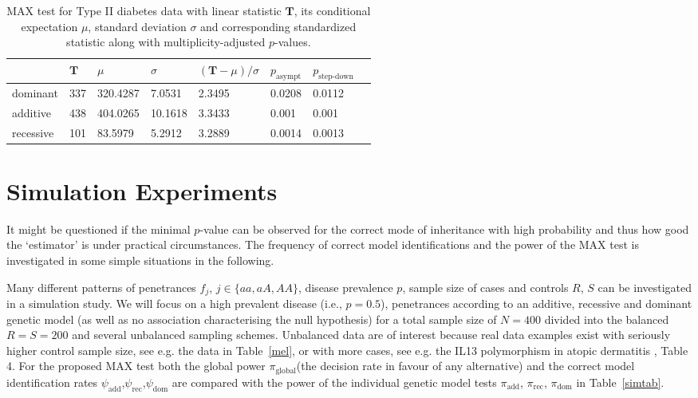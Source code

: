 \documentclass[bimj,fleqn]{w-art}
\newcommand{\T}{\mathbf{T}}
\begin{document}
\begin{table}
\begin{center}
\caption{MAX test for Type II diabetes data  with linear statistic  
         $\T$, its conditional expectation $\mu$, standard deviation 
         $\sigma$ and corresponding standardized statistic along with 
         multiplicity-adjusted $p$-values. \label{diares}}
\vspace*{0.5cm}
\begin{tabular}{l l l l l l l l}
 & $\T$ & $\mu$ & $ \sigma$ & $(\T - \mu) / \sigma$ & $p_\text{asympt}$ & $p_\text{step-down}$ \\ \hline
dominant  &  337 & 320.4287 & 7.0531 & 2.3495 & 0.0208 & 0.0112 \\ 
additive  &  438 & 404.0265 & 10.1618 & 3.3433 & 0.001 & 0.001 \\ 
recessive  &  101 & 83.5979 & 5.2912 & 3.2889 & 0.0014 & 0.0013 \\ \hline
\end{tabular}
\end{center}
\end{table}

\section{Simulation Experiments \label{sim}}

It might be questioned if the minimal $p$-value can be observed for the
correct mode of inheritance with high probability and thus how good the `estimator' 
is under practical circumstances. The frequency of
correct model identifications and the power of the MAX test is investigated
in some simple situations in the following.

Many different patterns of penetrances $f_j$, $j \in \{aa, aA, AA\}$, 
disease prevalence $p$, sample size of cases and controls 
$R$, $S$ can be investigated in a simulation study. We will 
focus on a high prevalent disease (i.e., $p=0.5$), penetrances according 
to an additive, recessive and dominant genetic model (as well as no 
association characterising the null hypothesis) for a total sample size 
of $N=400$ divided into the balanced $R=S=200$ and several unbalanced sampling schemes. 
Unbalanced data are of interest because real data examples exist with 
seriously higher control sample size, see e.g. the data in Table~\ref{mel}, 
or with more cases, see e.g. the IL13 polymorphism in atopic 
dermatitis \cite{Neuhauser:2002}, Table 4. For the proposed MAX test both the global 
power $\pi_\text{global}$(the decision rate in favour of any alternative) and the 
correct model identification rates $\psi_\text{add}$,$\psi_\text{rec}$,$\psi_\text{dom}$ 
are compared with the power of the individual genetic model tests 
$\pi_\text{add}$, $\pi_\text{rec}$, $\pi_\text{dom}$ in Table~\ref{simtab}.
\end{document}
